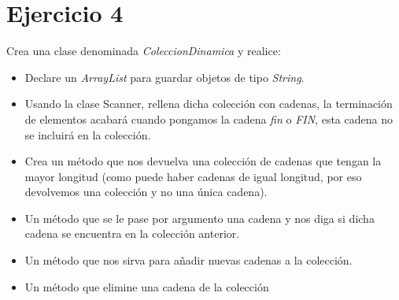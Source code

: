 \documentclass[4paper]{article}
\begin{document}
\section*{Ejercicio 4}
Crea una clase denominada \emph{ColeccionDinamica} y realice:
\begin{itemize}
\item Declare un \emph{ArrayList} para guardar objetos de tipo \emph{String}.
\item Usando la clase Scanner, rellena dicha colección con cadenas, la terminación de elementos acabará cuando pongamos la cadena \emph{fin} o \emph{FIN}, esta cadena no se incluirá en la colección.
\item Crea un método que nos devuelva una colección de cadenas que tengan la mayor longitud (como puede haber cadenas de igual longitud, por eso devolvemos una colección y no una única cadena).
\item Un método que se le pase por argumento una cadena y nos diga si dicha cadena se encuentra en la colección anterior.
\item Un método que nos sirva para añadir nuevas cadenas a la colección.
\item Un método que elimine una cadena de la colección

\end{itemize}
\end{document}
